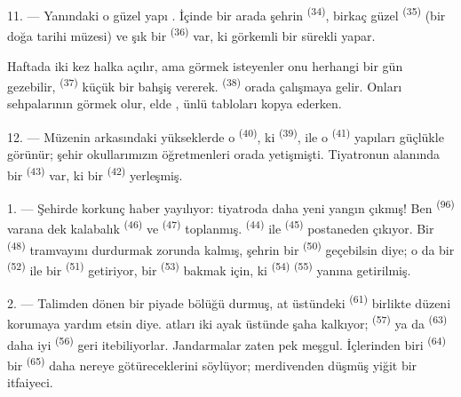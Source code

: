 11. --- Yanındaki o güzel yapı . İçinde bir arada şehrin
 \textsuperscript{(34)}, birkaç güzel  \textsuperscript{(35)} (bir doğa tarihi müzesi) ve şık bir
 \textsuperscript{(36)} var, ki görkemli bir sürekli
 yapar.

Haftada iki kez halka açılır, ama görmek isteyenler onu herhangi bir gün
gezebilir,  \textsuperscript{(37)} küçük bir bahşiş vererek.
 \textsuperscript{(38)} orada çalışmaya gelir. Onları
sehpalarının  görmek olur, elde , ünlü tabloları
kopya ederken.

12. --- Müzenin arkasındaki yükseklerde o 
\textsuperscript{(40)}, ki  \textsuperscript{(39)}, ile
o
 \textsuperscript{(41)} yapıları güçlükle görünür;
şehir okullarımızın öğretmenleri orada yetişmişti. Tiyatronun alanında bir
 \textsuperscript{(43)} var, ki bir 
\textsuperscript{(42)} yerleşmiş.

\VUsaut{5.0mm}
\VUsaut{3.0mm}

\VUsaut{3.4mm}

1. --- Şehirde korkunç haber yayılıyor: tiyatroda daha yeni yangın çıkmış!
Ben  \textsuperscript{(96)} varana dek kalabalık
 \textsuperscript{(46)} ve 
\textsuperscript{(47)} toplanmış. 
\textsuperscript{(44)} ile  \textsuperscript{(45)}
postaneden çıkıyor. Bir  \textsuperscript{(48)}
tramvayını durdurmak zorunda kalmış, şehrin bir 
\textsuperscript{(50)} geçebilsin diye; o da bir 
\textsuperscript{(52)} ile bir  \textsuperscript{(51)}
getiriyor, bir  \textsuperscript{(53)} bakmak için, ki
 \textsuperscript{(54)} 
\textsuperscript{(55)} yanına getirilmiş.

2. --- Talimden dönen bir piyade bölüğü durmuş, at üstündeki
 \textsuperscript{(61)} birlikte düzeni korumaya
yardım etsin diye.  atları iki ayak üstünde şaha kalkıyor;
 \textsuperscript{(57)} ya da 
\textsuperscript{(63)} daha iyi  \textsuperscript{(56)}
geri itebiliyorlar. Jandarmalar zaten pek meşgul. İçlerinden biri
 \textsuperscript{(64)} bir 
\textsuperscript{(65)} daha nereye götüreceklerini söylüyor; merdivenden
düşmüş yiğit bir itfaiyeci.

